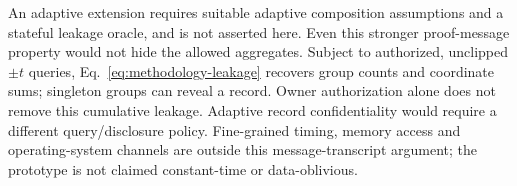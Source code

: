 \documentclass[5p,times,twocolumn]{elsarticle}
\begin{document}
An adaptive extension requires suitable adaptive composition assumptions
and a stateful leakage oracle, and is not asserted here. Even this stronger
proof-message property would not hide the allowed aggregates. Subject to
authorized, unclipped $\pm t$ queries, Eq.~\eqref{eq:methodology-leakage}
recovers group counts and coordinate sums; singleton groups can reveal a
record. Owner authorization alone does not remove this cumulative leakage.
Adaptive record confidentiality would require a different query/disclosure
policy. Fine-grained timing, memory access and operating-system channels
are outside this message-transcript argument; the prototype is not claimed
constant-time or data-oblivious.
\end{document}

